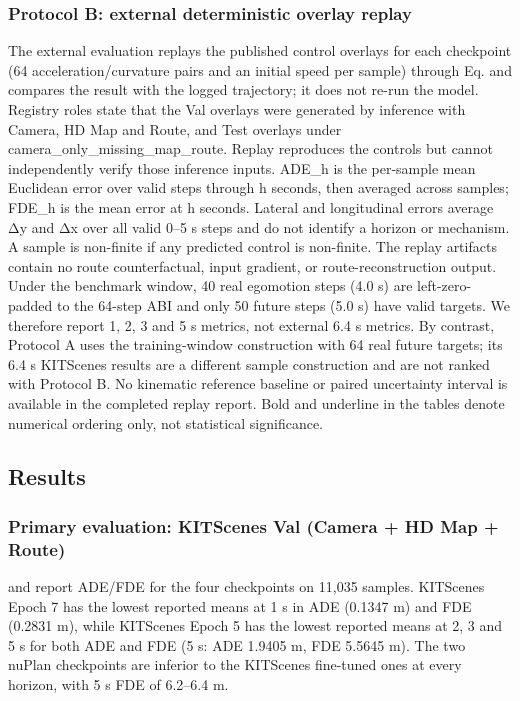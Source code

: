 \documentclass[
  english,
  10pt,
]{article}
\begin{document}
\subsubsection{Protocol B: external deterministic overlay
replay}\label{protocol-b-external-deterministic-overlay-replay}

The external evaluation replays the published control overlays for each
checkpoint (64 acceleration/curvature pairs and an initial speed per
sample) through Eq. \hyperref[eq-roll]{}and compares the result with the
logged trajectory; it does not re-run the model. Registry roles state
that the Val overlays were generated by inference with Camera, HD Map
and Route, and Test overlays under camera\_only\_missing\_map\_route.
Replay reproduces the controls but cannot independently verify those
inference inputs. ADE\_h is the per-sample mean Euclidean error over
valid steps through h seconds, then averaged across samples; FDE\_h is
the mean error at h seconds. Lateral and longitudinal errors average
\textbar Δy\textbar{} and \textbar Δx\textbar{} over all valid 0--5 s
steps and do not identify a horizon or mechanism. A sample is non-finite
if any predicted control is non-finite. The replay artifacts contain no
route counterfactual, input gradient, or route-reconstruction output.
Under the benchmark window, 40 real egomotion steps (4.0 s) are
left-zero-padded to the 64-step ABI and only 50 future steps (5.0 s)
have valid targets. We therefore report 1, 2, 3 and 5 s metrics, not
external 6.4 s metrics. By contrast, Protocol A uses the training-window
construction with 64 real future targets; its 6.4 s KITScenes results
are a different sample construction and are not ranked with Protocol B.
No kinematic reference baseline or paired uncertainty interval is
available in the completed replay report. Bold and underline in the
tables denote numerical ordering only, not statistical significance.

\subsection{Results}\label{results}

\subsubsection{Primary evaluation: KITScenes Val (Camera + HD Map +
Route)}\label{primary-evaluation-kitscenes-val-camera--hd-map--route}

\hyperref[tab-val-ade]{}and \hyperref[fig-val]{}report ADE/FDE for the
four checkpoints on 11,035 samples. KITScenes Epoch 7 has the lowest
reported means at 1 s in ADE (0.1347 m) and FDE (0.2831 m), while
KITScenes Epoch 5 has the lowest reported means at 2, 3 and 5 s for both
ADE and FDE (5 s: ADE 1.9405 m, FDE 5.5645 m). The two nuPlan
checkpoints are inferior to the KITScenes fine-tuned ones at every
horizon, with 5 s FDE of 6.2--6.4 m.
\end{document}
